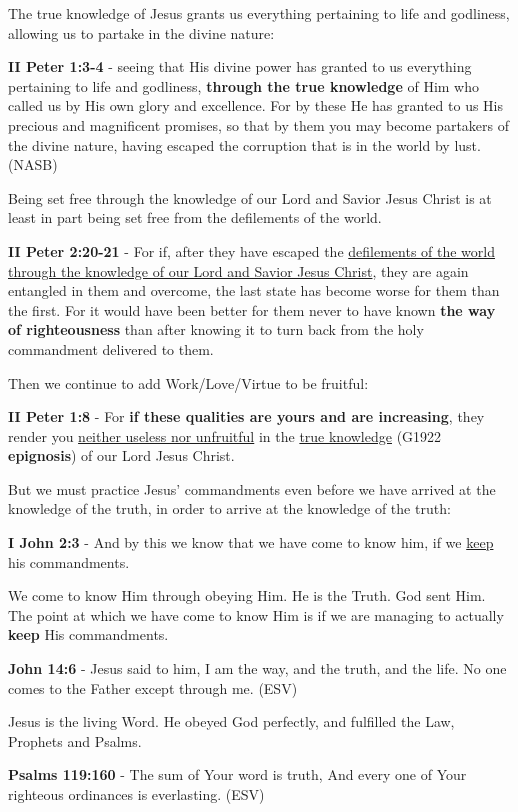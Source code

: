 \documentclass[11pt]{article}
\begin{document}
The true knowledge of Jesus grants us everything pertaining to life and godliness, allowing us to partake in the divine nature:

\textbf{II Peter 1:3-4} - seeing that His divine power has granted to us everything pertaining to life and godliness, \textbf{through the true knowledge} of Him who called us by His own glory and excellence. For by these He has granted to us His precious and magnificent promises, so that by them you may become partakers of the divine nature, having escaped the corruption that is in the world by lust. (NASB)

Being set free through the knowledge of our Lord and Savior Jesus Christ is at least in part being set free from the defilements of the world.

\textbf{II Peter 2:20-21} - For if, after they have escaped the \uline{defilements of the world through the knowledge of our Lord and Savior Jesus Christ}, they are again entangled in them and overcome, the last state has become worse for them than the first. For it would have been better for them never to have known \textbf{the way of righteousness} than after knowing it to turn back from the holy commandment delivered to them.

Then we continue to add Work/Love/Virtue to be fruitful:

\textbf{II Peter 1:8} - For \textbf{if these qualities are yours and are increasing}, they render you \uline{neither useless nor unfruitful} in the \uline{true knowledge} (G1922 \textbf{epignosis}) of our Lord Jesus Christ.

But we must practice Jesus' commandments even before we have arrived at the knowledge of the truth, in order to arrive at the knowledge of the truth:

\textbf{I John 2:3} - And by this we know that we have come to know him, if we \uline{keep} his commandments.

We come to know Him through obeying Him. He is the Truth. God sent Him.
The point at which we have come to know Him is if we are managing to actually \textbf{keep} His commandments.

\textbf{John 14:6} - Jesus said to him, I am the way, and the truth, and the life. No one comes to the Father except through me. (ESV)

Jesus is the living Word. He obeyed God perfectly, and fulfilled the Law, Prophets and Psalms.

\textbf{Psalms 119:160} - The sum of Your word is truth, And every one of Your righteous ordinances is everlasting. (ESV)
\end{document}
